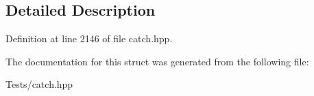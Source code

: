 \subsection{Detailed Description}


Definition at line 2146 of file catch.\+hpp.



The documentation for this struct was generated from the following file\+:\begin{DoxyCompactItemize}
\item 
Tests/catch.\+hpp\end{DoxyCompactItemize}
